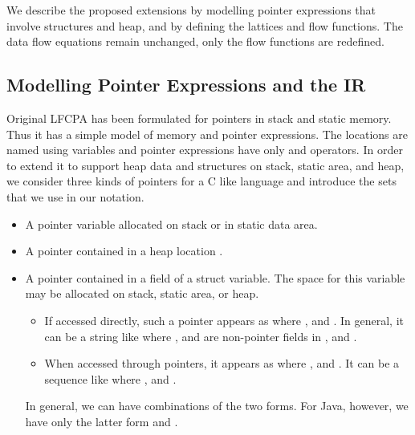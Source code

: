 \documentclass[a4paper,11pt,fleqn]{article}
\begin{document}
\newcommand{\heap}{\text{\sf\em H\/}\xspace}
\newcommand{\fields}{\text{\sf\em F\/}\xspace}
\newcommand{\pfield}{\text{\sf\em pF\/}\xspace}
\newcommand{\npfield}{\text{\sf\em npF\/}\xspace}
\newcommand{\lRef}{\text{{\sf\em Lref}}\xspace} 
\newcommand{\rRef}{\text{{\sf\em Rref}}\xspace}
\newcommand{\hloc}{\text{{\sf\em heap}}\xspace} 
\newcommand{\allocsite}{\text{{\sf\em get\_heap\_loc}}\xspace} 
\newcommand{\lval}{\text{\sf\em lval\/}\xspace} 
\newcommand{\rval}{\text{\sf\em rval\/}\xspace} 
\newcommand{\addr}{\text{{\sf\em addr}}\xspace} 
\newcommand{\refp}{\text{\sf\em ref\/}\xspace} 
\newcommand{\derefp}{\text{\sf\em deref\/}\xspace} 
\newcommand{\lhs}{\text{\sf\em lhs\/}\xspace} 
\newcommand{\rhs}{\text{\sf\em rhs\/}\xspace} 
\newcommand{\closure}{\text{\sf\em closure\/}\xspace} 

We describe the proposed extensions by modelling pointer expressions
that involve structures and heap, and by defining the lattices and flow
functions. The data flow equations remain unchanged, only the flow
functions are redefined. 

\subsection{Modelling Pointer Expressions and the IR}

Original LFCPA has been formulated for pointers in stack and static
memory. Thus it has a simple model of memory and pointer expressions. 
The locations are named using variables and pointer expressions have only  and 
operators. In order to extend it to support heap data and structures on
stack, static area, and heap, we consider three kinds of pointers for a
C like language and introduce the sets that we use in our notation.

\begin{itemize}
\item A pointer variable \text{} allocated on stack or
      in static data area.

\item A pointer contained in a heap location \text{}.

\item A pointer contained in a field  of a struct variable. The      
      space for this variable may be allocated on stack, static area,   
      or heap.                                                          

      \begin{itemize}
      \item If accessed directly, such a pointer appears as \text{} where
            \text{}, and \text{}.
            In general, it can be a string like \text{}
            where \text{},  and  are
            non-pointer fields in \npfield, and \text{}.
      \item When accessed through pointers, it appears as
            \text{} where \text{},
            and \text{}. It can be a sequence like
            \text{} where
            \text{}, and \text{}.
      \end{itemize}
      In general, we can have combinations of the two forms. For Java,
      however, we have only the latter form and \text{}.
\end{itemize}
\end{document}
